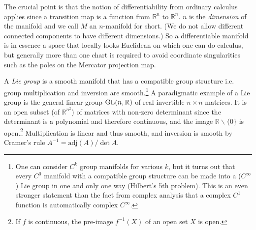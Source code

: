 The crucial point is that the notion of differentiability from ordinary calculus applies since a transition map is a function from $\mathbb{R}^n$ to $\mathbb{R}^n$. $n$ is the \emph{dimension} of the manifold and we call $M$ an $n$-manifold for short. (We do not allow different connected components to have different dimensions.) So a differentiable manifold is in essence a space that locally looks Euclidean on which one can do calculus, but generally more than one chart is required to avoid coordinate singularities such as the poles on the Mercator projection map.

A \emph{Lie group} is a smooth manifold that has a compatible group structure i.e. group multiplication and inversion are smooth.\footnote{One can consider $C^k$ group manifolds for various $k$, but it turns out that every $C^0$ manifold with a compatible group structure can be made into a ($C^{\infty}$) Lie group in one and only one way (Hilbert's 5th problem). This is an even stronger statement than the fact from complex analysis that a complex $C^1$ function is automatically complex $C^{\infty}$.} A paradigmatic example of a Lie group is the general linear group $\text{GL}(n,\mathbb{R})$ of real invertible $n \times n$ matrices. It is an open subset (of $\mathbb{R}^{n^2}$) of matrices with non-zero determinant since the determinant is a polynomial and therefore continuous, and the image $\mathbb{R}\backslash \{0\}$ is open.\footnote{If $f$ is continuous, the pre-image $f^{-1}(X)$ of an open set $X$ is open.} Multiplication is linear and thus smooth, and inversion is smooth by Cramer's rule $A^{-1} = \text{adj}(A)/\det A$.


